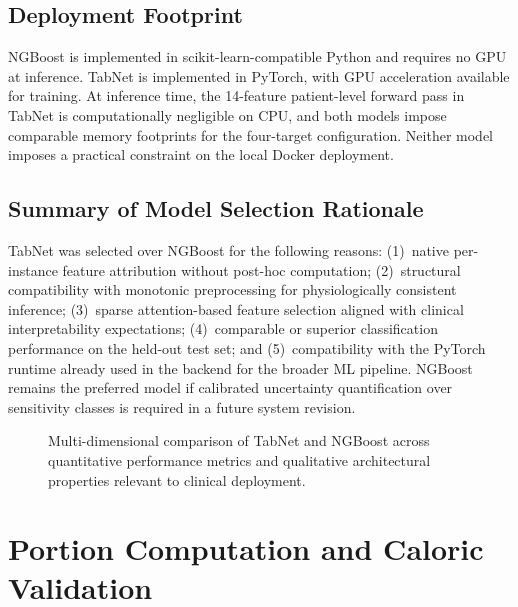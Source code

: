 \documentclass[journal]{IEEEtran}
\begin{document}
\subsection{Deployment Footprint}

NGBoost is implemented in scikit-learn-compatible Python and requires
no GPU at inference. TabNet is implemented in PyTorch, with GPU
acceleration available for training. At inference time, the 14-feature
patient-level forward pass in TabNet is computationally negligible on
CPU, and both models impose comparable memory footprints for the
four-target configuration. Neither model imposes a practical constraint
on the local Docker deployment.

\subsection{Summary of Model Selection Rationale}

TabNet was selected over NGBoost for the following reasons:
(1)~native per-instance feature attribution without post-hoc computation;
(2)~structural compatibility with monotonic preprocessing for
physiologically consistent inference;
(3)~sparse attention-based feature selection aligned with clinical
interpretability expectations;
(4)~comparable or superior classification performance on the held-out
test set;
and (5)~compatibility with the PyTorch runtime already used in the
backend for the broader ML pipeline. NGBoost remains the preferred
model if calibrated uncertainty quantification over sensitivity classes
is required in a future system revision.

\begin{figure}[!t]
    \centering
    \caption{Multi-dimensional comparison of TabNet and NGBoost across
    quantitative performance metrics and qualitative architectural
    properties relevant to clinical deployment.}
    \label{fig:comparison_radar}
\end{figure}

\section{Portion Computation and Caloric Validation}
\label{sec:portion}
\end{document}
